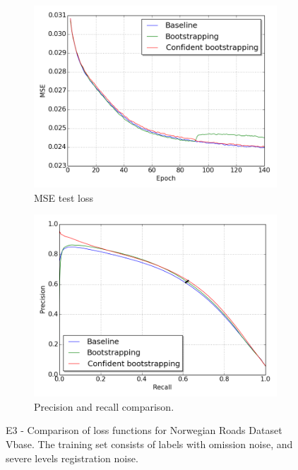 \begin{figure}
\begin{subfigure}{0.5\textwidth}
\includegraphics[width=\linewidth]{figs/E3/E3-lc.png}
\caption{MSE test loss} \label{fig:E3_boot_norway_vbase_loss}
\end{subfigure}
\hspace*{\fill} %
\begin{subfigure}{0.5\textwidth}
\includegraphics[width=\linewidth]{figs/E3/E3-pr.png}
\caption{Precision and recall comparison.} \label{fig:E3_boot_norway_vbase_pr}
\end{subfigure}
\hspace*{\fill} %
\caption[E3 - Comparison of loss functions for Norwegian Roads Dataset Vbase]{E3 - Comparison of loss functions for Norwegian Roads Dataset Vbase. The training set consists of labels with omission noise, and severe levels registration noise.} \label{fig:E3_boot_norway_vbase}
\end{figure}

